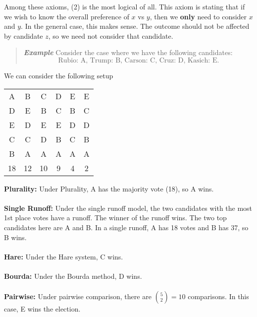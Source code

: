 \documentclass{hw}
\begin{document}
Among these axioms, (2) is the most logical of all. This axiom is stating that if we wish to know the
overall preference of $x$ vs $y$, then we \textbf{only} need to consider $x$ and $y$. In the general
case, this makes sense. The outcome should not be affected by candidate $z$, so we need not consider that
candidate.

\begin{quote}
\textit{\textbf{Example}} Consider the case where we have the following candidates:\\
\[\text{Rubio: A, Trump: B, Carson: C, Cruz: D, Kasich: E.}\]
\end{quote}
We can consider the following setup\\
\begin{center}
\begin{tabular}{c c c c c c}
A & B & C & D & E & E\\
D & E & B & C& B &C\\
E&D&E&E&D&D\\
C&C&D&B&C&B\\
B&A&A&A&A&A\\
\hline
18 & 12 & 10 & 9 & 4 & 2
\end{tabular}
\end{center}
\textbf{Plurality:} Under Plurality, A has the majority vote (18), so A wins.\\\\
\textbf{Single Runoff:} Under the single runoff model, the two candidates with the most 1st place votes
have a runoff. The winner of the runoff wins. The two top candidates here are A and B. In a single
runoff, A has 18 votes and B has 37, so B wins.\\\\
\textbf{Hare:} Under the Hare system, C wins.\\\\
\textbf{Bourda:} Under the Bourda method, D wins.\\\\
\textbf{Pairwise:} Under pairwise comparison, there are ${5 \choose 2} = 10$ comparisons.
In this case, E wins the election.
\end{document}

